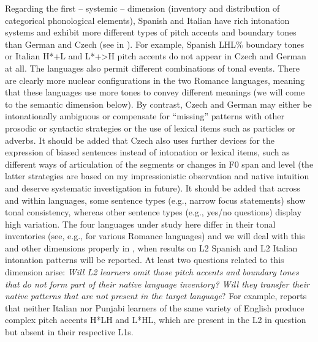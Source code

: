 Regarding the first -- systemic -- dimension (inventory and distribution of categorical phonological elements), Spanish and Italian have rich intonation systems and exhibit more different types of pitch accents and boundary tones than German and Czech (see  in ). For example, Spanish LHL\% boundary tones or Italian H*+L and L*+>H pitch accents do not appear in Czech and German at all. The languages also permit different combinations of tonal events. There are clearly more nuclear configurations in the two Romance languages, meaning that these languages use more tones to convey different meanings (we will come to the semantic dimension below). By contrast, Czech and German may either be intonationally ambiguous or compensate for “missing” patterns with other prosodic or syntactic strategies or the use of lexical items such as particles or adverbs. It should be added that Czech also uses further devices for the expression of biased sentences instead of intonation or lexical items, such as different ways of articulation of the segments or changes in F0 span and level (the latter strategies are based on my impressionistic observation and native intuition and deserve systematic investigation in future). It should be added that across and within languages, some sentence types (e.g., narrow focus statements) show tonal consistency, whereas other sentence types (e.g., yes/no questions) display high variation. The four languages under study here differ in their tonal inventories (see, e.g., \citealt{FrotaPrieto2015} for various Romance languages) and we will deal with this and other dimensions properly in , when results on L2 Spanish and L2 Italian intonation patterns will be reported. At least two questions related to this dimension arise: \textit{Will L2 learners omit those pitch accents and boundary tones that do not form part of their native language inventory? Will they transfer their native patterns that are not present in the target language}? For example, \citet{Mennen2015} reports that neither Italian nor Punjabi learners of the same variety of English produce complex pitch accents H*LH and L*HL, which are present in the L2 in question but absent in their respective L1s.\largerpage




